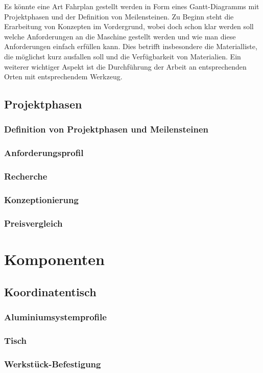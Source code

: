 \documentclass[
	a4paper,
	smallheadings,
	german,
	]
	{scrreprt}
\begin{document}
Es könnte eine Art Fahrplan gestellt werden in Form eines Gantt-Diagramms mit Projektphasen und der Definition von Meilensteinen.
Zu Beginn steht die Erarbeitung von Konzepten im Vordergrund, wobei doch schon klar werden soll welche Anforderungen an die Maschine gestellt werden und wie man diese Anforderungen einfach erfüllen kann.
Dies betrifft insbesondere die Materialliste, die möglichst kurz ausfallen soll und die Verfügbarkeit von Materialien.
Ein weiterer wichtiger Aspekt ist die Durchführung der Arbeit an entsprechenden Orten mit entsprechendem Werkzeug.

\section{Projektphasen}
\subsection{Definition von Projektphasen und Meilensteinen}
\subsection{Anforderungsprofil}
\subsection{Recherche}
\subsection{Konzeptionierung}
\subsection{Preisvergleich}

\chapter{Komponenten}
\section{Koordinatentisch}
	\subsection{Aluminiumsystemprofile}
	\subsection{Tisch}
	\subsection{Werkstück-Befestigung}
\end{document}
